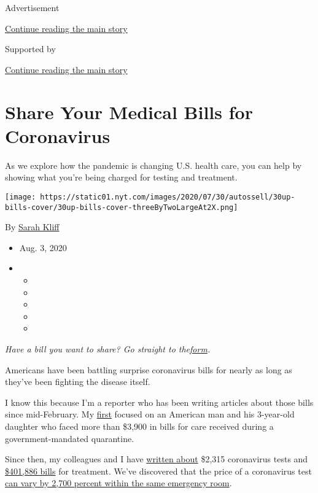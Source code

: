 Advertisement

\protect\hyperlink{after-top}{Continue reading the main story}

Supported by

\protect\hyperlink{after-sponsor}{Continue reading the main story}

\hypertarget{share-your-medical-bills-for-coronavirus}{%
\section{Share Your Medical Bills for
Coronavirus}\label{share-your-medical-bills-for-coronavirus}}

As we explore how the pandemic is changing U.S. health care, you can
help by showing what you're being charged for testing and treatment.

\texttt{[image: https://static01.nyt.com/images/2020/07/30/autossell/30up-bills-cover/30up-bills-cover-threeByTwoLargeAt2X.png]}

By \href{https://www.nytimes.com/by/sarah-kliff}{Sarah Kliff}

\begin{itemize}
\item
  Aug. 3, 2020
\item
  \begin{itemize}
  \item
  \item
  \item
  \item
  \item
  \end{itemize}
\end{itemize}

\emph{Have a bill you want to share? Go straight to
the}\href{https://www.nytimes.com/2020/08/03/reader-center/coronavirus-medical-bills.html\#link-61196606}{\emph{form}}\emph{.}

Americans have been battling surprise coronavirus bills for nearly as
long as they've been fighting the disease itself.

I know this because I'm a reporter who has been writing articles about
those bills since mid-February. My
\href{https://www.nytimes.com/2020/02/29/upshot/coronavirus-surprise-medical-bills.html}{first}
focused on an American man and his 3-year-old daughter who faced more
than \$3,900 in bills for care received during a government-mandated
quarantine.

Since then, my colleagues and I have
\href{https://www.nytimes.com/2020/06/16/upshot/coronavirus-test-cost-varies-widely.html}{written
about} \$2,315 coronavirus tests and
\href{https://www.nytimes.com/2020/06/14/nyregion/coronavirus-billing-nyc.html}{\$401,886
bills} for treatment. We've discovered that the price of a coronavirus
test
\href{https://www.nytimes.com/2020/06/29/upshot/coronavirus-tests-unpredictable-prices.html}{can
vary by 2,700 percent within the same emergency room}.

